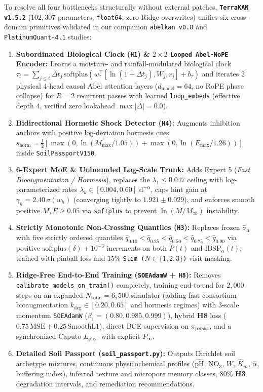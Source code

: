 \documentclass[10pt,twocolumn,a4paper]{article}
\begin{document}
To resolve all four bottlenecks structurally without external patches, \textbf{\texttt{TerraKAN v1.5.2}} ($102,307$ parameters, \texttt{float64}, zero Ridge overwrites) unifies six cross-domain primitives validated in our companion \texttt{abelkan v0.8} and \texttt{PlatinumQuant-4.1} studies:
\begin{enumerate}\setlength{\itemsep}{1pt}\setlength{\parskip}{0pt}
  \item \textbf{Subordinated Biological Clock (\texttt{H1}) \& $2\times 2$ \texttt{Looped Abel-NoPE} Encoder:} Learns a moisture- and rainfall-modulated biological clock $\tau_t = \sum_{j \le t} \Delta t_j\,\mathrm{softplus}(w_\tau^\top [\ln(1+\Delta t_j), W_j, r_j] + b_\tau)$ and iterates 2 physical 4-head causal Abel attention layers ($d_{\text{model}}=64$, no RoPE phase collapse) for $R=2$ recurrent passes with learned \texttt{loop\_embeds} (effective depth $4$, verified zero lookahead $\max|\Delta| = 0.0$).
  \item \textbf{Bidirectional Hormetic Shock Detector (\texttt{H4}):} Augments inhibition anchors with positive log-deviation hormesis cues $s_{\text{horm}} = \tfrac{1}{2}[\max(0, \ln(M_{\max}/1.05)) + \max(0, \ln(E_{\max}/1.26))]$ inside \texttt{SoilPassportV150}.
  \item \textbf{6-Expert MoE \& Unbounded Log-Scale Trunk:} Adds Expert 5 (\textit{Fast Bioaugmentation / Hormesis}), replaces the $\lambda_1 \le 0.047$ ceiling with log-parameterized rates $\lambda_k \in [0.004, 0.60]\text{ d}^{-\alpha}$, caps hint gain at $\gamma_h = 2.40\,\sigma(w_h)$ (converging tightly to $1.921 \pm 0.029$), and enforces smooth positive $M, E \ge 0.05$ via \texttt{softplus} to prevent $\ln(M/M_\infty)$ instability.
  \item \textbf{Strictly Monotonic Non-Crossing Quantiles (\texttt{H3}):} Replaces frozen $\hat{\sigma}_\alpha$ with five strictly ordered quantiles $\hat{q}_{0.10} < \hat{q}_{0.25} < \hat{q}_{0.50} < \hat{q}_{0.75} < \hat{q}_{0.90}$ via positive $\mathrm{softplus}(\delta) + 10^{-3}$ increments on both $\tilde{P}(t)$ and $\text{IBSP}_\alpha(t)$, trained with pinball loss and $15\%$ \texttt{Slim ($N \in \{1,2,3\}$)} visit masking.
  \item \textbf{Ridge-Free End-to-End Training (\texttt{SOEAdamW} + \texttt{H8}):} Removes \texttt{calibrate\_models\_on\_train()} completely, training end-to-end for $2,000$ steps on an expanded $N_{\text{train}} = 6,500$ simulator (adding fast consortium bioaugmentation $k_{\text{deg}} \in [0.20, 0.65]$ and hormesis regimes) with 3-scale momentum \texttt{SOEAdamW} ($\beta_1 = (0.80, 0.985, 0.999)$), hybrid \textbf{H8} loss ($0.75\,\text{MSE} + 0.25\,\text{SmoothL1}$), direct BCE supervision on $\pi_{\text{persist}}$, and a synchronized Caputo $L_{\text{phys}}$ with explicit $P_\infty$.
  \item \textbf{Detailed Soil Passport (\texttt{soil\_passport.py}):} Outputs Dirichlet soil archetype mixtures, continuous physicochemical profiles ($\widehat{\text{pH}}$, $\text{NO}_3$, $W$, $\hat{K}_m$, $\hat{\alpha}$, buffering index), inferred texture and micropore memory classes, 80\% \textbf{H3} degradation intervals, and remediation recommendations.
\end{enumerate}
\end{document}
